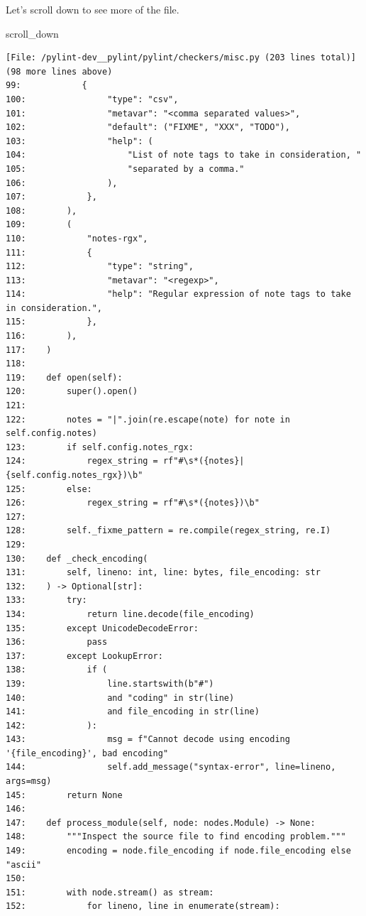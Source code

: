 {\begin{agentbox}
Let's scroll down to see more of the file.



\hrulefill
\begin{CodeVerbatim}[breaklines=true, breakanywhere=true]
scroll_down
\end{CodeVerbatim}
\end{agentbox}
\begin{observationbox}\begin{Verbatim}[breaklines=true, breakanywhere=true]
[File: /pylint-dev__pylint/pylint/checkers/misc.py (203 lines total)]
(98 more lines above)
99:            {
100:                "type": "csv",
101:                "metavar": "<comma separated values>",
102:                "default": ("FIXME", "XXX", "TODO"),
103:                "help": (
104:                    "List of note tags to take in consideration, "
105:                    "separated by a comma."
106:                ),
107:            },
108:        ),
109:        (
110:            "notes-rgx",
111:            {
112:                "type": "string",
113:                "metavar": "<regexp>",
114:                "help": "Regular expression of note tags to take in consideration.",
115:            },
116:        ),
117:    )
118:
119:    def open(self):
120:        super().open()
121:
122:        notes = "|".join(re.escape(note) for note in self.config.notes)
123:        if self.config.notes_rgx:
124:            regex_string = rf"#\s*({notes}|{self.config.notes_rgx})\b"
125:        else:
126:            regex_string = rf"#\s*({notes})\b"
127:
128:        self._fixme_pattern = re.compile(regex_string, re.I)
129:
130:    def _check_encoding(
131:        self, lineno: int, line: bytes, file_encoding: str
132:    ) -> Optional[str]:
133:        try:
134:            return line.decode(file_encoding)
135:        except UnicodeDecodeError:
136:            pass
137:        except LookupError:
138:            if (
139:                line.startswith(b"#")
140:                and "coding" in str(line)
141:                and file_encoding in str(line)
142:            ):
143:                msg = f"Cannot decode using encoding '{file_encoding}', bad encoding"
144:                self.add_message("syntax-error", line=lineno, args=msg)
145:        return None
146:
147:    def process_module(self, node: nodes.Module) -> None:
148:        """Inspect the source file to find encoding problem."""
149:        encoding = node.file_encoding if node.file_encoding else "ascii"
150:
151:        with node.stream() as stream:
152:            for lineno, line in enumerate(stream):

\end{Verbatim}
\end{observationbox}}
